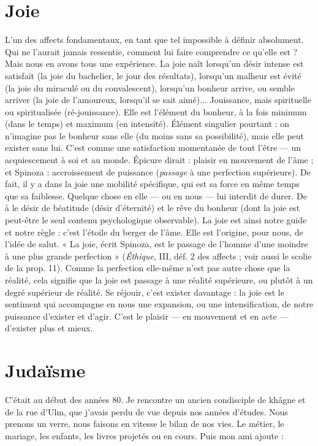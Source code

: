 {\section{Joie}
L'un des affects fondamentaux, en tant que tel impossible à définir
absolument. Qui ne l’aurait jamais ressentie, comment lui faire comprendre
ce qu’elle est ? Mais nous en avons tous une expérience. La joie naît
lorsqu’un désir intense est satisfait (la joie du bachelier, le jour des résultats),
lorsqu'un malheur est évité (la joie du miraculé ou du convalescent), lorsqu'un
bonheur arrive, ou semble arriver (la joie de l’amoureux, lorsqu'il se sait
aimé)... Jouissance, mais spirituelle ou spiritualisée (ré-jouissance). Elle est
l'élément du bonheur, à la fois minimum (dans le temps) et maximum (en
intensité). Élément singulier pourtant : on n’imagine pas le bonheur sans elle
(du moins sans sa possibilité), mais elle peut exister sans lui. C’est comme une
satisfaction momentanée de tout l’être — un acquiescement à soi et au monde.
Épicure dirait : plaisir en mouvement de l’âme ; et Spinoza : accroissement de
puissance ({\it passage} à une perfection supérieure). De fait, il y a dans la joie une
mobilité spécifique, qui est sa force en même temps que sa faiblesse. Quelque
chose en elle — ou en nous — lui interdit de durer. De à le désir de béatitude
(désir d’éternité) et le rêve du bonheur (dont la joie est peut-être le seul
contenu psychologique observable). La joie est ainsi notre guide et notre règle :
c’est l'étoile du berger de l’âme. Elle est l’origine, pour nous, de l’idée de salut.
« La joie, écrit Spinoza, est le passage de l’homme d’une moindre à une plus
grande perfection » ({\it Éthique}, III, déf. 2 des affects ; voir aussi le scolie de la
prop. 11). Comme la perfection elle-même n’est pas autre chose que la réalité,
cela signifie que la joie est passage à une réalité supérieure, ou plutôt à un degré
supérieur de réalité. Se réjouir, c’est exister davantage : la joie est le sentiment
qui accompagne en nous une expansion, ou une intensification, de notre puissance
d'exister et d’agir. C’est le plaisir — en mouvement et en acte — d’exister
plus et mieux.

\section{Judaïsme}
C'était au début des années 80. Je rencontre un ancien
condisciple de khâgne et de la rue d’Ulm, que j'avais perdu de
vue depuis nos années d’études. Nous prenons un verre, nous faisons en vitesse
le bilan de nos vies. Le métier, le mariage, les enfants, les livres projetés ou en
cours. Puis mon ami ajoute :

}

